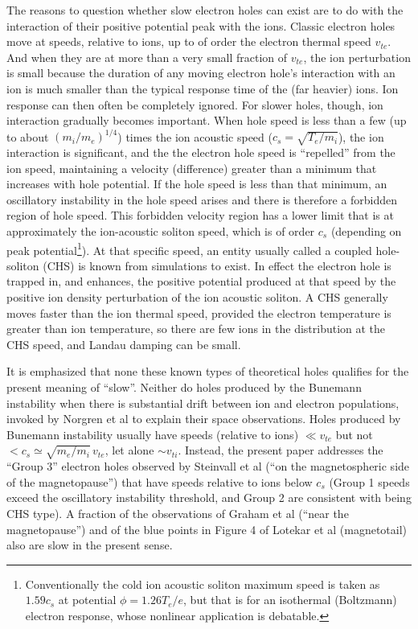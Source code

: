 \documentclass[12pt]{article}
\begin{document}
The reasons to question whether slow electron holes can exist are to
do with the interaction of their positive potential peak with the
ions. Classic electron holes move at speeds, relative to ions, up to
of order the electron thermal speed
$v_{te}$\cite{Schamel1986a,Hutchinson2017}. And when they are at more
than a very small fraction of $v_{te}$, the ion perturbation is small
because the duration of any moving electron hole's interaction with an
ion is much smaller than the typical response time of the (far
heavier) ions. Ion response can then often be completely ignored. For
slower holes, though, ion interaction gradually becomes important.
When hole speed is less than a few (up to about $(m_i/m_e)^{1/4}$)
times the ion acoustic speed ($c_s=\sqrt{T_e/m_i}$), the ion
interaction is significant, and the the electron hole speed is
``repelled'' from the ion speed\cite{Hutchinson2016,Zhou2016},
maintaining a velocity (difference) greater than a minimum that
increases with hole potential. If the hole speed is less than that
minimum, an oscillatory instability in the hole speed
arises\cite{Zhou2017} and there is therefore a forbidden region of
hole speed. This forbidden velocity region has a lower limit that is
at approximately the ion-acoustic soliton speed, which is of order
$c_s$ (depending on peak potential\footnote{Conventionally the cold
  ion acoustic soliton maximum speed is taken as $1.59c_s$ at
  potential $\phi=1.26T_e/e$, but that is for an isothermal
  (Boltzmann) electron response, whose nonlinear application is
  debatable.}). At that specific speed, an entity usually called a
coupled hole-soliton (CHS) is known from
simulations\cite{Saeki1991,Saeki1998,Zhou2018} to exist. In effect the
electron hole is trapped in, and enhances, the positive potential
produced at that speed by the positive ion density perturbation of the
ion acoustic soliton. A CHS generally moves faster than the ion
thermal speed, provided the electron temperature is greater than ion
temperature, so there are few ions in the distribution at the CHS
speed, and Landau damping can be small.

It is emphasized that none these known types of theoretical holes
qualifies for the present meaning of ``slow''. Neither do holes
produced by the Bunemann instability when there is substantial drift
between ion and electron populations, invoked by Norgren et
al\cite{Norgren2015,Norgren2015a} to explain their space
observations. Holes produced\cite{Drake2003,Khotyaintsev2010,Zhou2018}
by Bunemann instability usually have speeds (relative to ions)
$\ll v_{te}$ but not $<c_s\simeq\sqrt{m_e/m_i}\,v_{te}$, let alone
$\sim v_{ti}$.  Instead, the present paper addresses the ``Group 3''
electron holes observed by Steinvall et al\cite{Steinvall2019} (``on
the magnetospheric side of the magnetopause'') that have speeds
relative to ions below $c_s$ (Group 1 speeds exceed the oscillatory
instability threshold, and Group 2 are consistent with being CHS
type). A fraction of the observations of Graham et al\cite{Graham2016}
(``near the magnetopause'') and of the blue points in Figure 4 of
Lotekar et al\cite{Lotekar2020} (magnetotail) also are slow in the
present sense.
\end{document}
